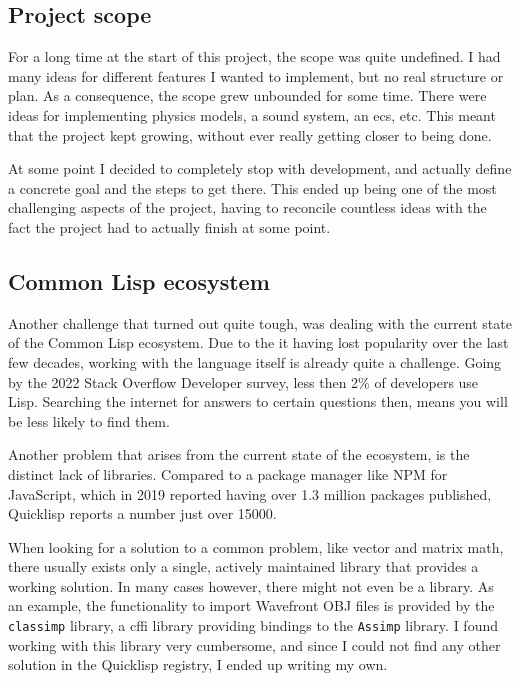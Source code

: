 
\subsection{Project scope}

For a long time at the start of this project,
the scope was quite undefined.
I had many ideas for different features I wanted to implement,
but no real structure or plan.
As a consequence,
the scope grew unbounded for some time.
There were ideas for implementing physics models,
a sound system,
an \ac{ecs}, etc.
This meant that the project kept growing,
without ever really getting closer to being done.

At some point I decided to completely stop with development,
and actually define a concrete goal and the steps to get there.
This ended up being one of the most challenging aspects of the project,
having to reconcile countless ideas with the fact the project had to actually finish at some point.

\subsection{Common Lisp ecosystem}

Another challenge that turned out quite tough,
was dealing with the current state of the Common Lisp ecosystem.
Due to the it having lost popularity over the last few decades,
working with the language itself is already quite a challenge.
Going by the 2022 Stack Overflow Developer survey,
less then 2\% of developers use Lisp.
Searching the internet for answers to certain questions then,
means you will be less likely to find them.

Another problem that arises from the current state of the ecosystem,
is the distinct lack of libraries.
Compared to a package manager like NPM for JavaScript,
which in 2019 reported having over 1.3 million packages published\cite{npm},
Quicklisp reports a number just over 15000\cite{quicklisp}.

When looking for a solution to a common problem,
like vector and matrix math,
there usually exists only a single,
actively maintained library that provides a working solution.
In many cases however,
there might not even be a library.
As an example,
the functionality to import Wavefront OBJ files is provided by the \texttt{classimp} library,
a \ac{cffi} library providing bindings to the \texttt{Assimp} library.
I found working with this library very cumbersome,
and since I could not find any other solution in the Quicklisp registry,
I ended up writing my own.

